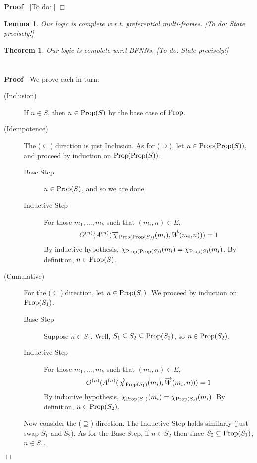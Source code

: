 \documentclass{article}
\newcommand{\tmop}[1]{\ensuremath{\operatorname{#1}}}
\newcommand{\tmtextbf}[1]{\text{{\bfseries{#1}}}}
\newcommand{\todo}[1]{{\color{red!75!black}[To do: #1]}}
\newenvironment{proof}{\noindent\textbf{Proof\ }}{\hspace*{\fill}$\Box$\medskip}
\newtheorem{lemma}{Lemma}
\newtheorem{theorem}{Theorem}
\newcommand{\bigchi}{\Large{\chi}}
\newcommand{\Prop}{\textsf{\tmop{Prop}}}
\begin{document}
\begin{proof}
  {\todo{}}
\end{proof}

\begin{lemma}
  Our logic is complete w.r.t. preferential multi-frames. {\todo{State
  precisely!}}
\end{lemma}

\begin{theorem}
  Our logic is complete w.r.t BFNNs. {\todo{State precisely!}}
\end{theorem}

\appendix\section*{}

\begin{proof}
  \tmtextbf{(of Proposition \ref{thm:prop-props})} We prove each in turn:
  \begin{description}
    \item[(Inclusion)] If $n \in S$, then $n \in \Prop (S)$ by the base case
    of $\Prop$.
    
    \item[(Idempotence)] The ($\subseteq$) direction is just Inclusion. As for
    ($\supseteq$), let $n \in \Prop (\Prop (S))$, and proceed by induction on
    $\Prop (\Prop (S))$.
    \begin{description}
      \item[Base Step] $n \in \Prop (S)$, and so we are done.
      
      \item[Inductive Step] For those $m_1, \ldots, m_k$ such that $(m_i, n)
      \in E$,
      \[ O^{(n)} (A^{(n)} (\smash{\overrightarrow{\bigchi}}_{\Prop (\Prop
         (S))} (m_i), \smash{\overrightarrow{W}} (m_i, n))) = 1 \]
      By inductive hypothesis, $\smash{\bigchi}_{\Prop (\Prop (S))} (m_i) =
      \smash{\bigchi}_{\Prop (S)} (m_i)$. By definition, $n \in \Prop (S)$.
    \end{description}
    \item[(Cumulative)] For the ($\subseteq$) direction, let $n \in \Prop
    (S_1)$. We proceed by induction on $\Prop (S_1)$.
    \begin{description}
      \item[Base Step] Suppose $n \in S_1$. Well, $S_1 \subseteq S_2 \subseteq
      \Prop (S_2)$, so $n \in \Prop (S_2)$.
      
      \item[Inductive Step] For those $m_1, \ldots, m_k$ such that $(m_i, n)
      \in E$,
      \[ O^{(n)} (A^{(n)} (\smash{\overrightarrow{\bigchi}}_{\Prop (S_1)}
         (m_i), \smash{\overrightarrow{W}} (m_i, n))) = 1 \]
      By inductive hypothesis, $\smash{\bigchi}_{\Prop (S_1)} (m_i) =
      \smash{\bigchi}_{\Prop (S_2)} (m_i)$. By definition, $n \in \Prop
      (S_2)$.
    \end{description}
    Now consider the ($\supseteq$) direction. The Inductive Step holds
    similarly (just swap $S_1$ and $S_2$). As for the Base Step, if $n \in
    S_2$ then since $S_2 \subseteq \Prop (S_1)$, $n \in S_1$.
    

\end{description}
\end{proof}
\end{document}
